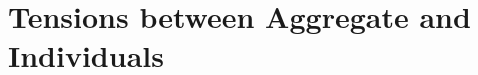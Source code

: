 \documentclass[11pt]{article} %
\makeatletter
\newcommand*{\eg}{e.g.\@\xspace}
\makeatother
\begin{document}









\section{Tensions between Aggregate and Individuals}
\label{sec:aggvsind}
\end{document}
